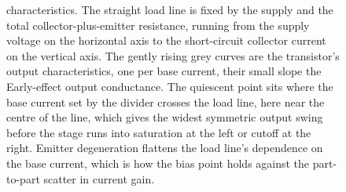\begin{figure}[htbp]
{characteristics. The straight load line is fixed by the supply and the total
collector-plus-emitter resistance, running from the supply voltage on the
horizontal axis to the short-circuit collector current on the vertical axis.
The gently rising grey curves are the transistor's output characteristics, one
per base current, their small slope the Early-effect output conductance. The
quiescent point sits where the base current set by the divider crosses the load
line, here near the centre of the line, which gives the widest symmetric output
swing before the stage runs into saturation at the left or cutoff at the right.
Emitter degeneration flattens the load line's dependence on the base current,
which is how the bias point holds against the part-to-part scatter in current
gain.}
\label{fig:vol04ch09:loadline}
\end{figure}
